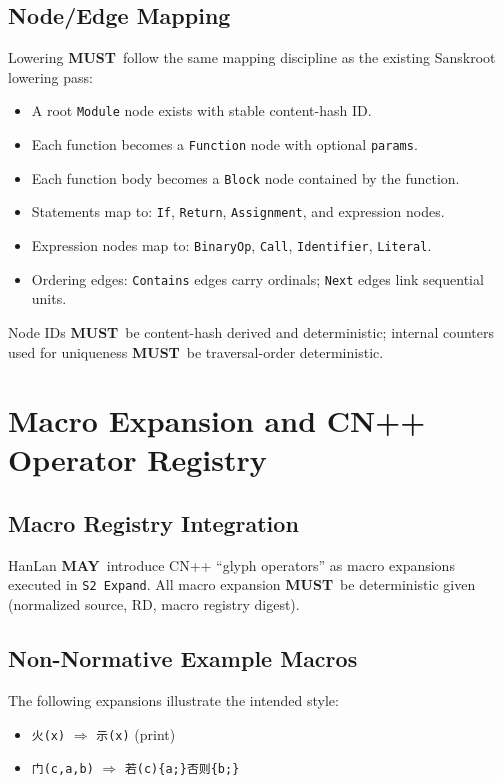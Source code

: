 \documentclass[12pt]{article}
\newcommand{\MUST}{\textbf{MUST}}
\newcommand{\MAY}{\textbf{MAY}}
\begin{document}
\subsection{Node/Edge Mapping}
Lowering \MUST\ follow the same mapping discipline as the existing Sanskroot lowering pass:
\begin{itemize}[leftmargin=1.5em]
  \item A root \texttt{Module} node exists with stable content-hash ID.
  \item Each function becomes a \texttt{Function} node with optional \texttt{params}.
  \item Each function body becomes a \texttt{Block} node contained by the function.
  \item Statements map to: \texttt{If}, \texttt{Return}, \texttt{Assignment}, and expression nodes.
  \item Expression nodes map to: \texttt{BinaryOp}, \texttt{Call}, \texttt{Identifier}, \texttt{Literal}.
  \item Ordering edges: \texttt{Contains} edges carry ordinals; \texttt{Next} edges link sequential units.
\end{itemize}
Node IDs \MUST\ be content-hash derived and deterministic; internal counters used for uniqueness \MUST\ be
traversal-order deterministic.

\section{Macro Expansion and CN++ Operator Registry}
\subsection{Macro Registry Integration}
HanLan \MAY\ introduce CN++ ``glyph operators'' as macro expansions executed in \texttt{S2 Expand}.
All macro expansion \MUST\ be deterministic given (normalized source, RD, macro registry digest).

\subsection{Non-Normative Example Macros}
The following expansions illustrate the intended style:
\begin{itemize}[leftmargin=1.5em]
  \item \texttt{火(x)} $\Rightarrow$ \texttt{示(x)} (print)
  \item \texttt{门(c,a,b)} $\Rightarrow$ \texttt{若(c)\{a;\}否则\{b;\}}
\end{itemize}
\end{document}

